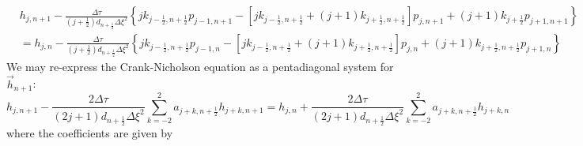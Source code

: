 \documentclass[12pt]{article}
\numberwithin{equation}{section}
\begin{document}
\begin{align}
	&h_{j, n+1} 
	-
	\frac{\Delta \tau}{(j +\frac{1}{2})d_{n+\frac{1}{2}}\Delta \xi^2}
	\left\{
		jk_{j-\frac{1}{2},n+\frac{1}{2}} p_{j-1,n+1}
		-
		[
			jk_{j-\frac{1}{2},n+\frac{1}{2}}
			+
			(j+1)k_{j+\frac{1}{2},n+\frac{1}{2}}
		]p_{j,n+1}
		+
		(j+1)k_{j+\frac{1}{2}} p_{j+1,n+1}
	\right\}
	\nonumber \\
	&=h_{j,n}
	-
	\frac{ \Delta \tau}{(j +\frac{1}{2})d_{n+\frac{1}{2}}\Delta \xi^2}
	\left\{
		jk_{j-\frac{1}{2},n+\frac{1}{2}} p_{j-1,n}
		-
		[
			jk_{j-\frac{1}{2},n+\frac{1}{2}}
			+
			(j+1)k_{j+\frac{1}{2},n+\frac{1}{2}}
		]p_{j,n}
		+
		(j+1)k_{j+\frac{1}{2},n+\frac{1}{2}} p_{j+1,n}
	\right\}
\end{align}
We may re-express the Crank-Nicholson equation as a pentadiagonal system for $\vec{h}_{n+1}$:
\begin{equation}
	h_{j, n+1} 
	-
	\frac{2\Delta \tau}{(2j + 1)d_{n+\frac{1}{2}} \Delta \xi^2}
	\sum_{k=-2}^2 a_{j+k,n+\frac{1}{2}} h_{j+k,n+1}
	=
	h_{j, n} 
	+
	\frac{2 \Delta \tau}{(2j +1)d_{n+\frac{1}{2}} \Delta \xi^2}
	\sum_{k=-2}^2 a_{j+k,n+\frac{1}{2}} h_{j+k,n}
\end{equation}
where the coefficients are given by
\end{document}

